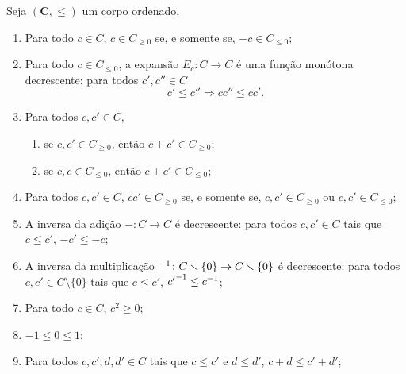 \begin{proposition}
Seja $(\bm C,\leq)$ um corpo ordenado.
	\begin{enumerate}
	\item Para todo $c \in C$, $c \in C_{\geq 0}$ se, e somente se, $-c \in C_{\leq 0}$;

	\item Para todo $c \in C_{\leq 0}$, a expansão $E_c\colon C \to C$ é uma função monótona decrescente: para todos $c',c'' \in C$
		\begin{equation*}
		c' \leq c'' \Rightarrow cc'' \leq cc'.
		\end{equation*}

	\item Para todos $c,c' \in C$,
		\begin{enumerate}
		\item se $c,c' \in C_{\geq 0}$, então $c+c' \in C_{\geq 0}$;

		\item se $c,c \in C_{\leq 0}$, então $c+c' \in C_{\leq 0}$;

		\end{enumerate}

	\item Para todos $c,c' \in C$, $cc' \in C_{\geq 0}$ se, e somente se, $c,c' \in C_{\geq 0}$ ou $c,c' \in C_{\leq 0}$;

	\item A inversa da adição $-\colon C \to C$ é decrescente: para todos $c,c' \in C$ tais que $c \leq c'$, $-c' \leq -c$;

	\item A inversa da multiplicação ${}^{-1}\colon C \smallsetminus \{0\} \to C \smallsetminus \{0\}$ é decrescente: para todos $c,c' \in C \setminus \{0\}$ tais que $c \leq c'$, ${c'}^{-1} \leq c^{-1}$;

	\item Para todo $c \in C$, $c^2 \geq 0$;

	\item $-1 \leq 0 \leq 1$;

	\item Para todos $c,c',d,d' \in C$ tais que $c \leq c'$ e $d \leq d'$, $c+d \leq c'+d'$;
	\end{enumerate}
\end{proposition}
